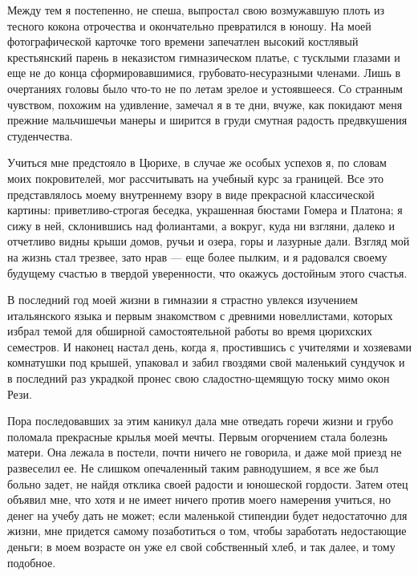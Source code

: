 Между тем я постепенно, не  спеша, выпростал свою возмужавшую плоть из
тесного кокона отрочества и окончательно  превратился в юношу. На моей
фотографической  карточке того  времени  запечатлен высокий  костлявый
крестьянский  парень в  неказистом  гимназическом  платье, с  тусклыми
глазами  и еще  не до  конца сформировавшимися,  грубовато-несуразными
членами. Лишь  в очертаниях головы  было что-то  не по летам  зрелое и
устоявшееся. Со странным  чувством, похожим на удивление,  замечал я в
те дни, вчуже, как покидают  меня прежние мальчишечьи манеры и ширится
в груди смутная радость предвкушения студенчества.

Учиться  мне  предстояло в  Цюрихе,  в  случае  же особых  успехов  я,
по  словам  моих  покровителей,   мог  рассчитывать  на  учебный  курс
за  границей.  Все  это   представлялось  моему  внутреннему  взору  в
виде  прекрасной  классической  картины:  приветливо-строгая  беседка,
украшенная бюстами  Гомера и  Платона; я сижу  в ней,  склонившись над
фолиантами, а вокруг, куда ни  взгляни, далеко и отчетливо видны крыши
домов, ручьи и  озера, горы и лазурные дали. Взгляд  мой на жизнь стал
трезвее, зато нрав --- еще более пылким, и я радовался своему будущему
счастью в твердой уверенности, что окажусь достойным этого счастья.

В последний  год моей  жизни в гимназии  я страстно  увлекся изучением
итальянского  языка  и  первым знакомством  с  древними  новеллистами,
которых  избрал темой  для  обширной самостоятельной  работы во  время
цюрихских семестров.  И наконец  настал день,  когда я,  простившись с
учителями и хозяевами комнатушки под крышей, упаковал и забил гвоздями
свой  маленький  сундучок  и  в последний  раз  украдкой  пронес  свою
сладостно-щемящую тоску мимо окон Рези.

Пора последовавших  за этим каникул  дала мне отведать горечи  жизни и
грубо поломала  прекрасные крылья моей мечты.  Первым огорчением стала
болезнь матери. Она лежала в постели, почти ничего не говорила, и даже
мой приезд не развеселил ее. Не слишком опечаленный таким равнодушием,
я все же был больно задет,  не найдя отклика своей радости и юношеской
гордости. Затем  отец объявил мне, что  хотя и не имеет  ничего против
моего  намерения  учиться, но  денег  на  учебу  дать не  может;  если
маленькой стипендии будет недостаточно  для жизни, мне придется самому
позаботиться  о  том,  чтобы  заработать недостающие  деньги;  в  моем
возрасте  он  уже ел  свой  собственный  хлеб,  и  так далее,  и  тому
подобное.

